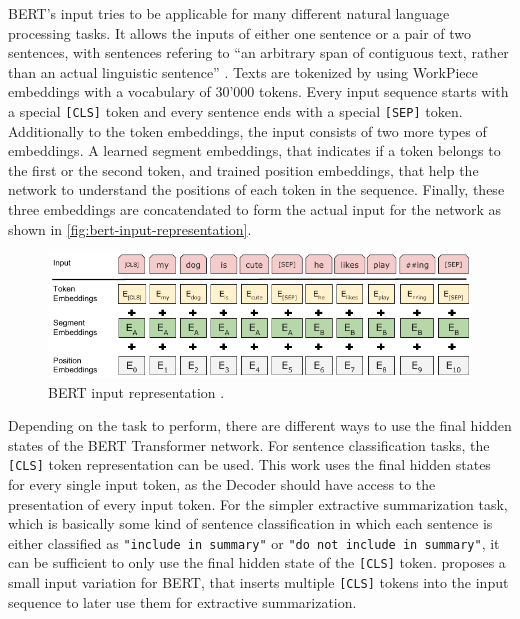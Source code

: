 BERT's input tries to be applicable for many different natural language processing tasks.
It allows the inputs of either one sentence or a pair of two sentences, with sentences refering to ``an arbitrary span of contiguous text, rather than an actual linguistic sentence'' \cite[p.~4]{devlin2018bert}.
Texts are tokenized by using WorkPiece embeddings with a vocabulary of 30'000 tokens. %
Every input sequence starts with a special \texttt{[CLS]} token and every sentence ends with a special \texttt{[SEP]} token.
Additionally to the token embeddings, the input consists of two more types of embeddings.
A learned segment embeddings, that indicates if a token belongs to the first or the second token, and trained position embeddings, that help the network to understand the positions of each token in the sequence.
Finally, these three embeddings are concatendated to form the actual input for the network as shown in \autoref{fig:bert-input-representation}.

\begin{figure}[h]
\centering
\includegraphics{figures/bert-input-representation}
\caption[BERT input representation]{BERT input representation \cite[p.~5]{devlin2018bert}.}
\label{fig:bert-input-representation}
\end{figure}

Depending on the task to perform, there are different ways to use the final hidden states of the BERT Transformer network.
For sentence classification tasks, the \texttt{[CLS]} token representation can be used.
This work uses the final hidden states for every single input token, as the Decoder should have access to the presentation of every input token.
For the simpler extractive summarization task, which is basically some kind of sentence classification in which each sentence is either classified as \texttt{"include in summary"} or \texttt{"do not include in summary"}, it can be sufficient to only use the final hidden state of the \texttt{[CLS]} token. 
\cite{1903.10318} proposes a small input variation for BERT, that inserts multiple \texttt{[CLS]} tokens into the input sequence to later use them for extractive summarization.

